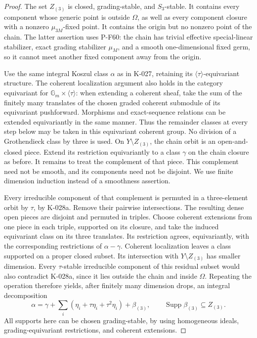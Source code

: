 \begin{proof}
The set $Z_{(3)}$ is closed, grading-stable, and $S_3$-stable.
It contains every component whose generic point is outside
$\Omega$, as well as every component closure with a nonzero
$\mu_{3M}$-fixed point.  It contains the origin but no nonzero
point of the chain.  The latter assertion uses P-F60: the chain
has trivial effective special-linear stabilizer, exact grading
stabilizer $\mu_M$, and a smooth one-dimensional fixed germ, so
it cannot meet another fixed component away from the origin.

Use the same integral Koszul class $\alpha$ as in K-027, retaining
its $\langle\tau\rangle$-equivariant structure.  The coherent
localization argument also holds in the category equivariant for
$\mathbb G_m\times\langle\tau\rangle$: when extending a coherent
sheaf, take the sum of the finitely many translates of the chosen
graded coherent submodule of its equivariant pushforward.  Morphisms
and exact-sequence relations can be extended equivariantly in the
same manner.  Thus the remainder classes at every step below may
be taken in this equivariant coherent group.  No division of a
Grothendieck class by three is used.  On
$Y\setminus Z_{(3)}$, the chain orbit is an open-and-closed
piece.  Extend its restriction equivariantly to a class $\gamma$ on the chain
closure as before.  It remains to treat the complement of that
piece.  This complement need not be smooth, and its components
need not be disjoint.  We use finite dimension induction instead
of a smoothness assertion.

Every irreducible component of that complement is permuted in
a three-element orbit by $\tau$, by K-028a.  Remove their pairwise
intersections.  The resulting dense open pieces are disjoint
and permuted in triples.  Choose coherent extensions from one
piece in each triple, supported on its closure, and take the
induced equivariant class on its three translates.  Its restriction
agrees, equivariantly, with the corresponding
restrictions of $\alpha-\gamma$.  Coherent localization leaves
a class supported on a proper closed subset.  Its intersection
with $Y\setminus Z_{(3)}$ has smaller dimension.  Every
$\tau$-stable irreducible component of this residual subset
would also contradict K-028a, since it lies outside the chain
and inside $\Omega$.  Repeating the operation therefore yields,
after finitely many dimension drops, an integral decomposition
\[
 \alpha=\gamma+
       \sum_i(\eta_i+\tau\eta_i+\tau^2\eta_i)
       +\beta_{(3)},
          \qquad \operatorname{Supp}\beta_{(3)}\subseteq Z_{(3)}.
                                                        \tag{K-028d}
\]
All supports here can be chosen grading-stable, by using homogeneous
ideals, grading-equivariant restrictions, and coherent extensions.


\end{proof}
